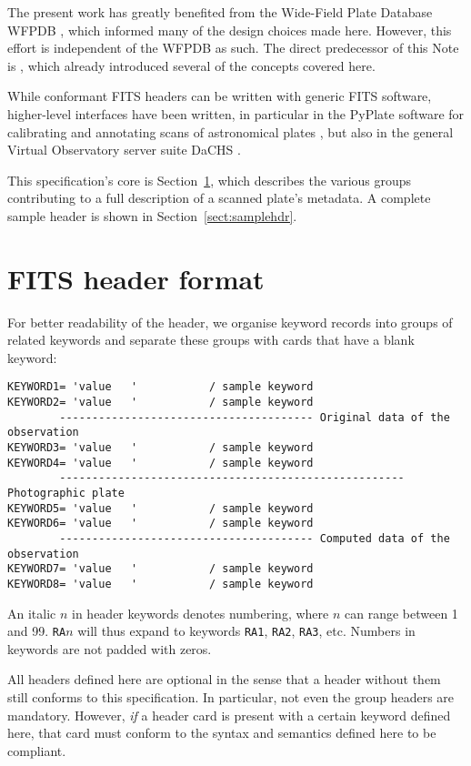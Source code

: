 \documentclass[11pt]{ivoa}
\newcommand\cardname[1]{\texttt{\color{keyword}#1}}
\begin{document}
The present work has greatly benefited from the Wide-Field Plate
Database WFPDB \citep{1995LNP...454..412T}, which informed many of the
design choices made here.  However, this effort is independent of the
WFPDB as such.  The direct predecessor of this Note is \citet{paper1},
which already introduced several of the concepts covered here.

While conformant FITS headers can be written with generic FITS software,
higher-level interfaces have been written, in particular in the PyPlate
software for calibrating and annotating scans of astronomical plates
\citep{soft:pyplates}, but also in the general Virtual Observatory
server suite DaCHS \citep{2014A+C.....7...27D}.

This specification's core is Section~\ref{sect:format}, which describes
the various groups contributing to a full description of a scanned
plate's metadata.  A complete
sample header is shown in Section~\ref{sect:samplehdr}.

\section{FITS header format}
\label{sect:format}

For better readability of the header, we organise keyword records
into groups of related keywords and separate these groups with
cards that have a blank keyword:

\begin{lstlisting}
KEYWORD1= 'value   '           / sample keyword
KEYWORD2= 'value   '           / sample keyword
        --------------------------------------- Original data of the observation
KEYWORD3= 'value   '           / sample keyword
KEYWORD4= 'value   '           / sample keyword
        ----------------------------------------------------- Photographic plate
KEYWORD5= 'value   '           / sample keyword
KEYWORD6= 'value   '           / sample keyword
        --------------------------------------- Computed data of the observation
KEYWORD7= 'value   '           / sample keyword
KEYWORD8= 'value   '           / sample keyword
\end{lstlisting}

An italic $n$ in header keywords denotes numbering, where $n$
can range between 1 and 99.  \cardname{RA$n$} will thus expand to
keywords \cardname{RA1}, \cardname{RA2}, \cardname{RA3}, etc. Numbers in
keywords are not padded with zeros.

All headers defined here are optional in the sense that a header without
them still conforms to this specification.  In particular, not even the
group headers are mandatory.  However, \emph{if} a header card is present
with a certain keyword defined here, that card must conform to the
syntax and semantics defined here to be compliant.
\end{document}
